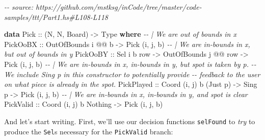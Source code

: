 \documentclass[]{article}
\newenvironment{Shaded}{}{}
\newcommand{\CommentTok}[1]{\textcolor[rgb]{0.38,0.63,0.69}{\textit{#1}}}
\newcommand{\DataTypeTok}[1]{\textcolor[rgb]{0.56,0.13,0.00}{#1}}
\newcommand{\KeywordTok}[1]{\textcolor[rgb]{0.00,0.44,0.13}{\textbf{#1}}}
\newcommand{\NormalTok}[1]{#1}
\newcommand{\OperatorTok}[1]{\textcolor[rgb]{0.40,0.40,0.40}{#1}}
\newcommand{\OtherTok}[1]{\textcolor[rgb]{0.00,0.44,0.13}{#1}}
\begin{document}
\begin{Shaded}
\begin{Highlighting}[]
\CommentTok{{-}{-} source: https://github.com/mstksg/inCode/tree/master/code{-}samples/ttt/Part1.hs\#L108{-}L118}

\KeywordTok{data} \DataTypeTok{Pick}\OtherTok{ ::}\NormalTok{ (}\DataTypeTok{N}\NormalTok{, }\DataTypeTok{N}\NormalTok{, }\DataTypeTok{Board}\NormalTok{) }\OtherTok{{-}>} \DataTypeTok{Type} \KeywordTok{where}
    \CommentTok{{-}{-} | We are out of bounds in x}
    \DataTypeTok{PickOoBX}\OtherTok{   ::} \DataTypeTok{OutOfBounds}\NormalTok{ i }\OperatorTok{@@}\NormalTok{ b                         }\OtherTok{{-}>} \DataTypeTok{Pick}\NormalTok{ \textquotesingle{}(i, j, b)}
    \CommentTok{{-}{-} | We are in{-}bounds in x, but out of bounds in y}
    \DataTypeTok{PickOoBY}\OtherTok{   ::} \DataTypeTok{Sel}\NormalTok{ i b row        }\OtherTok{{-}>} \DataTypeTok{OutOfBounds}\NormalTok{ j }\OperatorTok{@@}\NormalTok{ row }\OtherTok{{-}>} \DataTypeTok{Pick}\NormalTok{ \textquotesingle{}(i, j, b)}
    \CommentTok{{-}{-} | We are in{-}bounds in x, in{-}bounds in y, but spot is taken by \textasciigrave{}p\textasciigrave{}.}
    \CommentTok{{-}{-} We include \textasciigrave{}Sing p\textasciigrave{} in this constructor to potentially provide}
    \CommentTok{{-}{-} feedback to the user on what piece is already in the spot.}
    \DataTypeTok{PickPlayed}\OtherTok{ ::} \DataTypeTok{Coord}\NormalTok{ \textquotesingle{}(i, j) b (}\DataTypeTok{\textquotesingle{}Just}\NormalTok{ p) }\OtherTok{{-}>} \DataTypeTok{Sing}\NormalTok{ p        }\OtherTok{{-}>} \DataTypeTok{Pick}\NormalTok{ \textquotesingle{}(i, j, b)}
    \CommentTok{{-}{-} | We are in{-}bounds in x, in{-}bounds in y, and spot is clear}
    \DataTypeTok{PickValid}\OtherTok{  ::} \DataTypeTok{Coord}\NormalTok{ \textquotesingle{}(i, j) b }\DataTypeTok{\textquotesingle{}Nothing}                   \OtherTok{{-}>} \DataTypeTok{Pick}\NormalTok{ \textquotesingle{}(i, j, b)}
\end{Highlighting}
\end{Shaded}

And let's start writing. First, we'll use our decision functions
\texttt{selFound} to \emph{try} to produce the \texttt{Sel}s necessary for the
\texttt{PickValid} branch:

\begin{Shaded}
\end{Shaded}
\end{document}
